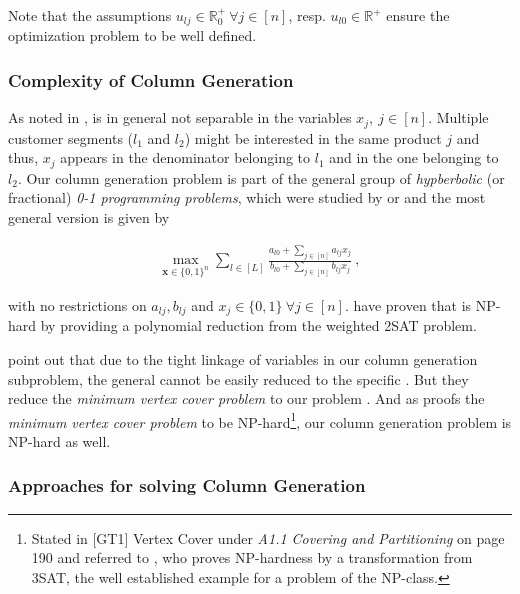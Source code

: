 Note that the assumptions $u_{lj} \in \mathbb{R}^+_0 ~\forall j \in [n]$, resp. $u_{l0} \in \mathbb{R}^+$ ensure the optimization problem to be well defined.

\subsubsection{Complexity of Column Generation}

As noted in \cite{Bront.2009},  is in general not separable in the variables $x_j,~j\in[n]$. Multiple customer segments (\eg $l_1$ and $l_2$) might be interested in the same product $j$ and thus, $x_j$ appears in the denominator belonging to $l_1$ and in the one belonging to $l_2$. Our column generation problem is part of the general group of \emph{hypberbolic} (or fractional) \emph{0-1 programming problems}, which were studied by \eg \cite{Hansen.1991} or \cite{Borrero.2017} and the most general version is given by


\begin{align}
	\max_{\boldsymbol{x} \in \{0,1\}^n} \sum_{l \in [L]} \frac{a_{l0} + \sum_{j \in [n]}a_{lj}x_j}{b_{l0} + \sum_{j \in [n]} b_{lj}x_j}~,\label{eq-hyp}
\end{align}

with no restrictions on $a_{lj}, b_{lj}$ and $x_j \in \{0, 1\} ~\forall j \in [n]$. \cite{Prokopyev.2005} have proven that  is NP-hard by providing a polynomial reduction from the weighted 2SAT problem. 


\cite{Bront.2009} point out that due to the tight linkage of variables in our column generation subproblem, the general  cannot be easily reduced to the specific . But they reduce the \emph{minimum vertex cover problem} to our problem . And as \cite{Garey.ca.2009} proofs the \emph{minimum vertex cover problem} to be NP-hard\footnote{Stated in [GT1] Vertex Cover under \emph{A1.1 Covering and Partitioning} on page 190 and referred to \cite{Karp.2010}, who proves NP-hardness by a transformation from 3SAT, the well established example for a problem of the NP-class.}, our column generation problem is NP-hard as well. 

\subsubsection{Approaches for solving Column Generation}

